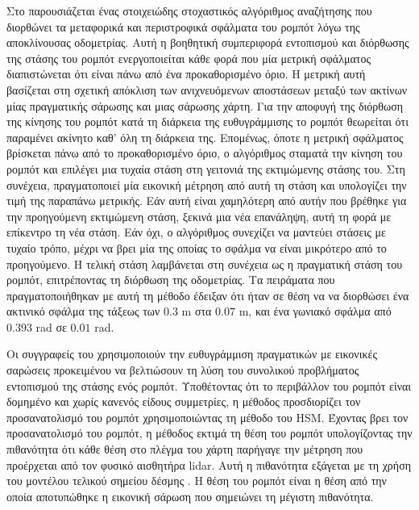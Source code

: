 Στο \cite{Sandberg2009a} παρουσιάζεται ένας στοιχειώδης στοχαστικός αλγόριθμος
αναζήτησης που διορθώνει τα μεταφορικά και περιστροφικά σφάλματα του ρομπότ
λόγω της αποκλίνουσας οδομετρίας. Αυτή η βοηθητική συμπεριφορά εντοπισμού και
διόρθωσης της στάσης του ρομπότ ενεργοποιείται κάθε φορά που μία μετρική
σφάλματος διαπιστώνεται ότι είναι πάνω από ένα προκαθορισμένο όριο. Η μετρική
αυτή βασίζεται στη σχετική απόκλιση των ανιχνευόμενων αποστάσεων μεταξύ των
ακτίνων μίας πραγματικής σάρωσης και μιας σάρωσης χάρτη. Για την αποφυγή της
διόρθωση της κίνησης του ρομπότ κατά τη διάρκεια της ευθυγράμμισης το ρομπότ
θεωρείται ότι παραμένει ακίνητο καθ' όλη τη διάρκεια της. Επομένως, όποτε η
μετρική σφάλματος βρίσκεται πάνω από το προκαθορισμένο όριο, ο αλγόριθμος
σταματά την κίνηση του ρομπότ και επιλέγει μια τυχαία στάση στη γειτονιά της
εκτιμώμενης στάσης του. Στη συνέχεια, πραγματοποιεί μία εικονική μέτρηση από
αυτή τη στάση και υπολογίζει την τιμή της παραπάνω μετρικής. Εάν αυτή είναι
χαμηλότερη από αυτήν που βρέθηκε για την προηγούμενη εκτιμώμενη στάση, ξεκινά
μια νέα επανάληψη, αυτή τη φορά με επίκεντρο τη νέα στάση. Εάν όχι, ο
αλγόριθμος συνεχίζει να μαντεύει στάσεις με τυχαίο τρόπο, μέχρι να βρει μία της
οποίας το σφάλμα να είναι μικρότερο από το προηγούμενο. Η τελική στάση
λαμβάνεται στη συνέχεια ως η πραγματική στάση του ρομπότ, επιτρέποντας τη
διόρθωση της οδομετρίας. Τα πειράματα που πραγματοποιήθηκαν με αυτή τη μέθοδο
έδειξαν ότι ήταν σε θέση να να διορθώσει ένα ακτινικό σφάλμα της τάξεως των
$0.3$ m στα $0.07$ m, και ένα γωνιακό σφάλμα από $0.393$ rad σε $0.01$ rad.

Οι συγγραφείς του \cite{Zhu2011a} χρησιμοποιούν την ευθυγράμμιση πραγματικών με
εικονικές σαρώσεις προκειμένου να βελτιώσουν τη λύση του συνολικού προβλήματος
εντοπισμού της στάσης ενός ρομπότ. Υποθέτοντας ότι το περιβάλλον του ρομπότ
είναι δομημένο και χωρίς κανενός είδους συμμετρίες, η μέθοδος προσδιορίζει τον
προσανατολισμό του ρομπότ χρησιμοποιώντας τη μέθοδο του HSM. Έχοντας βρει τον
προσανατολισμό του ρομπότ, η μέθοδος εκτιμά τη θέση του ρομπότ υπολογίζοντας
την πιθανότητα ότι κάθε θέση στο πλέγμα του χάρτη παρήγαγε την μέτρηση που
προέρχεται από τον φυσικό αισθητήρα lidar. Αυτή η πιθανότητα εξάγεται με τη
χρήση του μοντέλου τελικού σημείου δέσμης \cite{thrun2005probabilistic}. Η θέση
του ρομπότ είναι η θέση από την οποία αποτυπώθηκε η εικονική σάρωση που
σημειώνει τη μέγιστη πιθανότητα.

